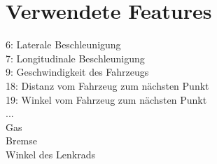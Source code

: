 \section{Verwendete Features} %
\label{sec:Berechnung_der_benutzten_Features}
6:  Laterale Beschleunigung\\
7:  Longitudinale Beschleunigung\\
9:  Geschwindigkeit des Fahrzeugs\\
18: Distanz vom Fahrzeug zum nächsten Punkt\\
19: Winkel vom Fahrzeug zum nächsten Punkt\\
...\\
Gas\\
Bremse\\
Winkel des Lenkrads\\

